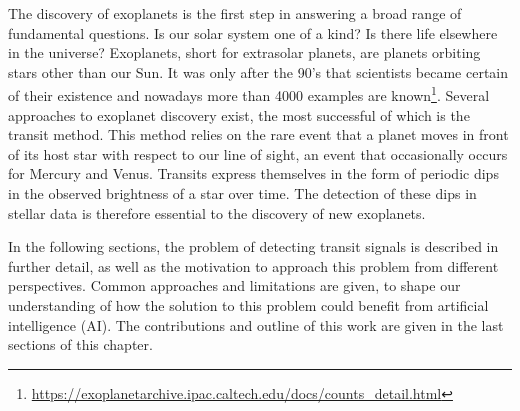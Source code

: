 
The discovery of exoplanets is the first step in answering a broad range of fundamental questions. Is our solar system one of a kind? Is there life elsewhere in the universe? Exoplanets, short for extrasolar planets, are planets orbiting stars other than our Sun. It was only after the 90's that scientists became certain of their existence and nowadays more than 4000 examples are known\footnote{\url{https://exoplanetarchive.ipac.caltech.edu/docs/counts_detail.html}}. Several approaches to exoplanet discovery exist, the most successful of which is the transit method. This method relies on the rare event that a planet moves in front of its host star with respect to our line of sight, an event that occasionally occurs for Mercury and Venus. Transits express themselves in the form of periodic dips in the observed brightness of a star over time.  The detection of these dips in stellar data is therefore essential to the discovery of new exoplanets. 

In the following sections, the problem of detecting transit signals is described in further detail, as well as the motivation to approach this problem from different perspectives. Common approaches and limitations are given, to shape our understanding of how the solution to this problem could benefit from artificial intelligence (AI). The contributions and outline of this work are given in the last sections of this chapter.